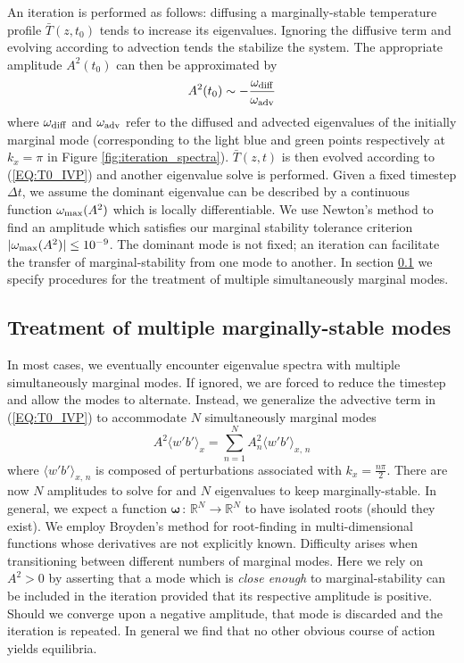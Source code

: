 \documentclass[reprint,amsmath,amssymb,aps]{revtex4-1}
\begin{document}
An iteration is performed as follows: diffusing a marginally-stable temperature profile $\bar{T}(z, t_0)$ tends to increase its eigenvalues. 
Ignoring the diffusive term and evolving according to advection tends the stabilize the system. The appropriate amplitude $A^2(t_0)$ can then be approximated by
\begin{equation}
    A^2(t_0) \sim -\frac{\omega_{\rm{diff}}}{\omega_{\rm{adv}}}
\end{equation}
where $\omega_{\rm{diff}}$ and $\omega_{\rm{adv}}$ refer to the diffused and advected eigenvalues of the initially marginal mode (corresponding to the light blue and green points respectively at $k_x = \pi$ in Figure \ref{fig:iteration_spectra}). 
$\bar{T}(z, t)$ is then evolved according to (\ref{EQ:T0_IVP}) and another eigenvalue solve is performed. 
Given a fixed timestep $\Delta t$, we assume the dominant eigenvalue can be described by a continuous function $\omega_{\rm{max}} (A^2)$ which is locally differentiable. 
We use Newton's method to find an amplitude which satisfies our marginal stability tolerance criterion $|\omega_{\rm{max}} (A^2)| \leq 10^{-9}$. 
The dominant mode is not fixed; an iteration can facilitate the transfer of marginal-stability from one mode to another. 
In section \ref{sec:multiple_modes} we specify procedures for the treatment of multiple simultaneously marginal modes.

\subsection{Treatment of multiple marginally-stable modes} \label{sec:multiple_modes}
In most cases, we eventually encounter eigenvalue spectra with multiple simultaneously marginal modes. If ignored, we are forced to reduce the timestep and allow the modes to alternate. Instead, we generalize the advective term in (\ref{EQ:T0_IVP}) to accommodate $N$ simultaneously marginal modes
\begin{equation}
    A^2 \langle w' b' \rangle_x = \sum_{n = 1}^{N} A^2_{n} \langle w' b' \rangle_{x, \, n}
\end{equation}
where  $\langle w' b' \rangle_{x, \, n}$ is composed of perturbations associated with $k_x = \frac{n\pi}{2}$. 
There are now $N$ amplitudes to solve for and $N$ eigenvalues to keep marginally-stable. 
In general, we expect a function $\mathbf{\omega} \, : \, \mathbb{R}^N \to  \mathbb{R}^N$ to have isolated roots (should they exist). 
We employ Broyden's method for root-finding in multi-dimensional functions whose derivatives are not explicitly known. 
Difficulty arises when transitioning between different numbers of marginal modes. 
Here we rely on $A^2 > 0$ by asserting that a mode which is \textit{close enough} to marginal-stability can be included in the iteration provided that its respective amplitude is positive. 
Should we converge upon a negative amplitude, that mode is discarded and the iteration is repeated. 
In general we find that no other obvious course of action yields equilibria.
\end{document}
